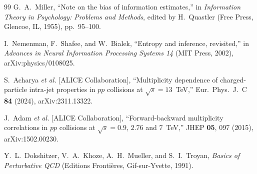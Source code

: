 \documentclass[11pt]{article}
\begin{document}
\begin{thebibliography}{99}
G.~A.~Miller,
``Note on the bias of information estimates,''
in \emph{Information Theory in Psychology: Problems and Methods},
edited by H.~Quastler (Free Press, Glencoe, IL, 1955), pp.~95--100.

I.~Nemenman, F.~Shafee, and W.~Bialek,
``Entropy and inference, revisited,''
in \emph{Advances in Neural Information Processing Systems 14} (MIT
Press, 2002),
arXiv:physics/0108025.

S.~Acharya \emph{et al.} [ALICE Collaboration],
``Multiplicity dependence of charged-particle intra-jet properties in
$pp$ collisions at $\sqrt{s}=13$~TeV,''
Eur.\ Phys.\ J.\ C \textbf{84} (2024),
arXiv:2311.13322.

J.~Adam \emph{et al.} [ALICE Collaboration],
``Forward-backward multiplicity correlations in $pp$ collisions at
$\sqrt{s}=0.9$, $2.76$ and $7$~TeV,''
JHEP \textbf{05}, 097 (2015),
arXiv:1502.00230.

Y.~L.~Dokshitzer, V.~A.~Khoze, A.~H.~Mueller, and S.~I.~Troyan,
\emph{Basics of Perturbative QCD} (Editions Fronti\`eres, Gif-sur-Yvette,
1991).

\end{thebibliography}
\end{document}
